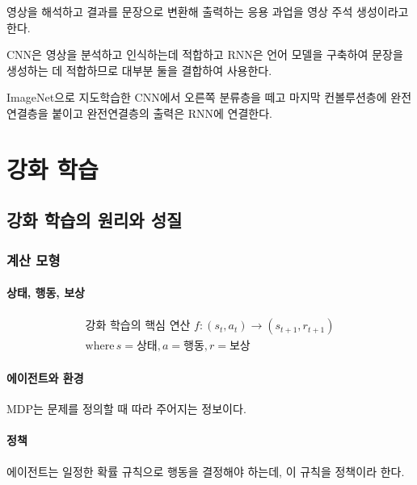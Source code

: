 \documentclass [12pt] {oblivoir}
\let\oldsubsubsection=\subsubsection
\renewcommand{\subsubsection}
{
  \filbreak
  \oldsubsubsection
}
\begin{document}
영상을 해석하고 결과를 문장으로 변환해 출력하는 응용 과업을 영상 주석 생성이라고 한다.

CNN은 영상을 분석하고 인식하는데 적합하고 RNN은 언어 모델을 구축하여 문장을 생성하는 데 적합하므로 대부분 둘을 결합하여 사용한다.

ImageNet으로 지도학습한 CNN에서 오른쪽 분류층을 떼고 마지막 컨볼루션층에 완전연결층을 붙이고 완전연결층의 출력은 RNN에 연결한다.

\newpage
\section{강화 학습}

\subsection{강화 학습의 원리와 성질}

\subsubsection{계산 모형}

\paragraph*{상태, 행동, 보상}\mbox{}

\begin{align*} \tag{9.1}
  \text{강화 학습의 핵심 연산 } f:(s_{t}, a_{t}) \rightarrow (s_{t+1}, r_{t+1}) \\
  \mathrm{where}\, s = \text{상태}, a = \text{행동}, r = \text{보상}
\end{align*}

\vspace{3mm}

\paragraph*{에이전트와 환경}\mbox{}

MDP는 문제를 정의할 때 따라 주어지는 정보이다.

\vspace{3mm}

\paragraph*{정책}\mbox{}

에이전트는 일정한 확률 규칙으로 행동을 결정해야 하는데, 이 규칙을 정책이라 한다.
\end{document}

